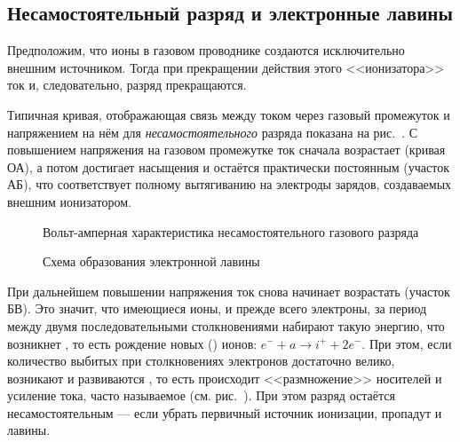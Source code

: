 \subsection*{Несамостоятельный разряд и электронные лавины}
Предположим, что ионы в газовом проводнике создаются исключительно внешним
источником. Тогда при прекращении действия этого <<ионизатора>> ток и,
следовательно, разряд прекращаются.

Типичная кривая, отображающая связь между током через газовый промежуток и
напряжением на нём для \emph{несамостоятельного} разряда показана на
рис.~. С повышением напряжения
на газовом промежутке ток сначала возрастает (кривая ОА), а потом достигает
насыщения и остаётся практически постоянным (участок АБ), что соответствует
полному вытягиванию на электроды зарядов, создаваемых внешним ионизатором.

\begin{figure}[h]
    \centering
    \caption{Вольт-амперная характеристика несамостоятельного газового разряда}
\end{figure}

\begin{figure}[h]
    \centering
    \caption{Схема образования электронной лавины}
\end{figure}

При дальнейшем повышении напряжения ток снова начинает возрастать (участок БВ).
Это значит, что имеющиеся ионы, и прежде всего электроны, за период между двумя
последовательными столкновениями набирают такую энергию, что возникнет
, то есть рождение новых 
() ионов: $e^{-}+a\to i^{+} + 2 e^{-}$. При этом,
если количество выбитых при столкновениях электронов достаточно велико,
возникают и развиваются ,
то есть происходит <<размножение>> носителей и усиление тока,
часто называемое  (см. рис.~).
При этом разряд остаётся несамостоятельным --- если убрать первичный источник
ионизации, пропадут и лавины.




